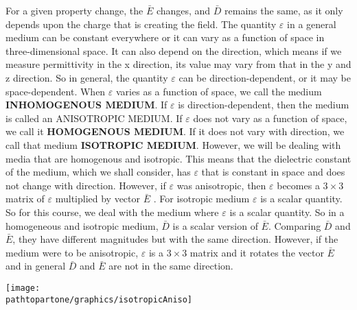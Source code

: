 \begin{mdframed}[ backgroundcolor=lightblue, linewidth=1pt, hidealllines=true]
For a given property change, the $\bar{E}$ changes, and $\bar{D}$ remains the same, as it only depends upon the charge that is creating the field. The quantity $\varepsilon$ in a general medium can be constant everywhere or it can vary as a function of space in three-dimensional space. It can also depend on the direction, which means if we measure permittivity in the x direction, its value may vary from that in the y and z direction. So in general, the quantity  $\varepsilon$  can be direction-dependent, or it may be space-dependent. When  $\varepsilon$  varies as a function of space, we call the medium \textbf{INHOMOGENOUS MEDIUM}. If  $\varepsilon$  is direction-dependent, then the medium is called an ANISOTROPIC MEDIUM. If  $\varepsilon$ does not vary as a function of space, we call it \textbf{HOMOGENOUS MEDIUM}. If it does not vary with direction, we call that medium \textbf{ISOTROPIC MEDIUM}.
However, we will be dealing with media that are homogenous and isotropic. This means that the dielectric constant of the medium, which we shall consider, has  $\varepsilon$ that is constant in space and does not change with direction. However, if  $\varepsilon$  was anisotropic, then  $\varepsilon$  becomes a $3\times 3$ matrix of  $\varepsilon$  multiplied by vector $\bar{E}$ . For isotropic medium  $\varepsilon$  is a scalar quantity. So for this course, we deal with the medium where  $\varepsilon$  is a scalar quantity.
So in a homogeneous and isotropic medium,  $\bar{D}$ is a scalar version of  $\bar{E}$. Comparing  $\bar{D}$ and  $\bar{E}$, they have different magnitudes but with the same direction. However, if the medium were to be anisotropic,  $\varepsilon$ is a $3\times 3$ matrix and it rotates the vector  $\bar{E}$ and in general  $\bar{D}$ and  $\bar{E}$ are not in the same direction.

\begin{minipage}{1\linewidth}
\centering
\texttt{[image: \\pathtopartone/graphics/isotropicAniso]}
\label{fig:isotropicAniso}
\end{minipage}


\end{mdframed}
